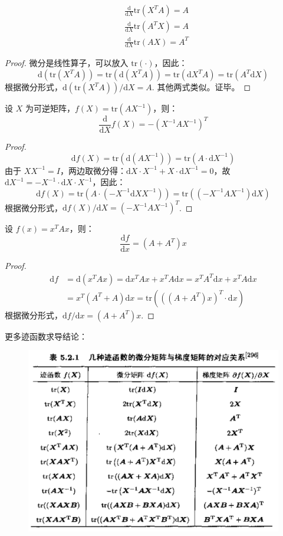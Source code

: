 \begin{example}[迹函数的导数]
\begin{align*}
    &\frac{\mathrm d}{\mathrm dX}\mathrm{tr}(X^TA)=A\\
    &\frac{\mathrm d}{\mathrm dX}\mathrm{tr}(A^TX)=A\\
    &\frac{\mathrm d}{\mathrm dX}\mathrm{tr}(AX)=A^T
\end{align*}
\end{example}
\begin{proof}
微分是线性算子，可以放入 $\mathrm{tr}(\cdot)$，因此：
\[
    \mathrm d(\mathrm{tr}(X^TA))=\mathrm{tr}(\mathrm d(X^TA))=\mathrm{tr}(\mathrm dX^T A)=\mathrm{tr}(A^T\mathrm dX)
\]
根据微分形式，$\mathrm d(\mathrm{tr}(X^TA))/\mathrm dX=A$.  其他两式类似。证毕。
\end{proof}
\begin{example}
设 $X$ 为可逆矩阵，$f(X)=\mathrm{tr}(AX^{-1})$，则：
\[
    \frac{\mathrm d}{\mathrm dX}f(X)=-(X^{-1}AX^{-1})^T
\]
\end{example}
\begin{proof}
\[
    \mathrm df(X)=\mathrm{tr}(\mathrm d(AX^{-1}))=\mathrm{tr}(A\cdot\mathrm dX^{-1})
\]
由于 $XX^{-1}=I$，两边取微分得：$\mathrm dX\cdot X^{-1}+X\cdot\mathrm dX^{-1}=0$，故 $\mathrm dX^{-1}=-X^{-1}\cdot\mathrm dX\cdot X^{-1}$，因此：
\[
    \mathrm df(X)=\mathrm{tr}\left(A\cdot(-X^{-1}\mathrm dX X^{-1})\right)=\mathrm{tr}\left((-X^{-1}AX^{-1})\mathrm dX\right)
\]
根据微分形式，$\mathrm df(X)/\mathrm dX=(-X^{-1}AX^{-1})^T$.
\end{proof}

\begin{example}
设 $f(x)=x^TAx$，则：
\[
    \frac{\mathrm df}{\mathrm dx}=(A+A^T)x
\]
\end{example}
\begin{proof}
\begin{align*}
    \mathrm df&=\mathrm d(x^TAx)=\mathrm dx^TAx+x^TA\mathrm dx=x^T A^T\mathrm dx+x^TA\mathrm dx\\&=x^T(A^T+A)\mathrm dx=\mathrm{tr}\left(((A+A^T)x)^T\cdot\mathrm dx\right)
\end{align*}
根据微分形式，$\mathrm df/\mathrm dx=(A+A^T)x$.
\end{proof}

\begin{example}
更多迹函数求导结论：
\begin{figure}[H]
    \centering
    \includegraphics[width=0.7\linewidth]{figs/table1.png}
\end{figure}
\end{example}

